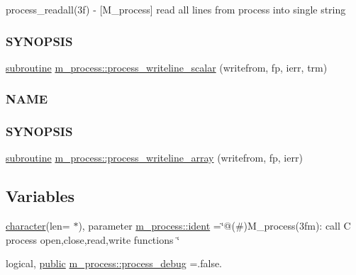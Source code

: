\begin{DoxyCompactItemize}
\begin{DoxyCompactList}
process\+\_\+readall(3f) -\/ \mbox{[}M\+\_\+process\mbox{]} read all lines from process into single string \subsubsection*{S\+Y\+N\+O\+P\+S\+IS}\end{DoxyCompactList}\item 
\hyperlink{M__stopwatch_83_8txt_acfbcff50169d691ff02d4a123ed70482}{subroutine} \hyperlink{namespacem__process_a72527c0ec0af26dcb14b8bfad6dcd482}{m\+\_\+process\+::process\+\_\+writeline\+\_\+scalar} (writefrom, fp, ierr, trm)
\begin{DoxyCompactList}\small\item\em \subsubsection*{N\+A\+ME}

\subsubsection*{S\+Y\+N\+O\+P\+S\+IS}\end{DoxyCompactList}\item 
\hyperlink{M__stopwatch_83_8txt_acfbcff50169d691ff02d4a123ed70482}{subroutine} \hyperlink{namespacem__process_a08887a918eba167ceacddf58ca084270}{m\+\_\+process\+::process\+\_\+writeline\+\_\+array} (writefrom, fp, ierr)
\end{DoxyCompactItemize}
\subsection*{Variables}
\begin{DoxyCompactItemize}
\item 
\hyperlink{option__stopwatch_83_8txt_abd4b21fbbd175834027b5224bfe97e66}{character}(len= $\ast$), parameter \hyperlink{namespacem__process_ac360b3ab77dd978287edf0a0773922de}{m\+\_\+process\+::ident} =\char`\"{}@(\#)M\+\_\+process(3fm)\+: call C process open,close,read,write functions \char`\"{}
\item 
logical, \hyperlink{M__stopwatch_83_8txt_a2f74811300c361e53b430611a7d1769f}{public} \hyperlink{namespacem__process_a0fabee8d01338d5523fbdea5c5f1e894}{m\+\_\+process\+::process\+\_\+debug} =.false.
\end{DoxyCompactItemize}
